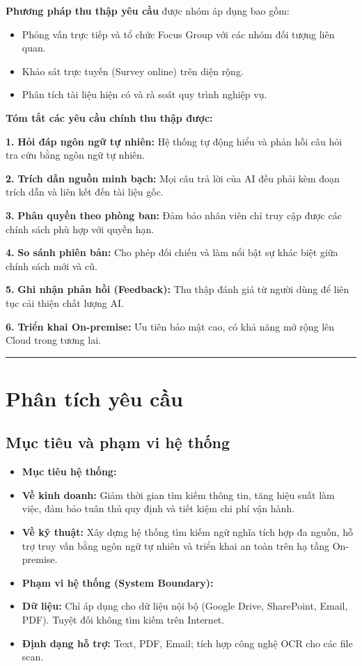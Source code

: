 \documentclass[12pt,a4paper]{report}
\begin{document}
\textbf{Phương pháp thu thập yêu cầu} được nhóm áp dụng bao gồm:
\begin{itemize}
    \item Phỏng vấn trực tiếp và tổ chức Focus Group với các nhóm đối tượng liên quan.
    \item Khảo sát trực tuyến (Survey online) trên diện rộng.
    \item Phân tích tài liệu hiện có và rà soát quy trình nghiệp vụ.
\end{itemize}

\textbf{Tóm tắt các yêu cầu chính thu thập được:}

\textbf{1.} \textbf{Hỏi đáp ngôn ngữ tự nhiên:} Hệ thống tự động hiểu và phản hồi câu hỏi tra cứu bằng ngôn ngữ tự nhiên.


\textbf{2.} \textbf{Trích dẫn nguồn minh bạch:} Mọi câu trả lời của AI đều phải kèm đoạn trích dẫn và liên kết đến tài liệu gốc.


\textbf{3.} \textbf{Phân quyền theo phòng ban:} Đảm bảo nhân viên chỉ truy cập được các chính sách phù hợp với quyền hạn.


\textbf{4.} \textbf{So sánh phiên bản:} Cho phép đối chiếu và làm nổi bật sự khác biệt giữa chính sách mới và cũ.


\textbf{5.} \textbf{Ghi nhận phản hồi (Feedback):} Thu thập đánh giá từ người dùng để liên tục cải thiện chất lượng AI.


\textbf{6.} \textbf{Triển khai On-premise:} Ưu tiên bảo mật cao, có khả năng mở rộng lên Cloud trong tương lai.



\rule{\textwidth}{0.5pt}


\section{Phân tích yêu cầu}

\subsection{Mục tiêu và phạm vi hệ thống}
\begin{itemize}
    \item \textbf{Mục tiêu hệ thống:}
    \item \textbf{Về kinh doanh:} Giảm thời gian tìm kiếm thông tin, tăng hiệu suất làm việc, đảm bảo tuân thủ quy định và tiết kiệm chi phí vận hành.
    \item \textbf{Về kỹ thuật:} Xây dựng hệ thống tìm kiếm ngữ nghĩa tích hợp đa nguồn, hỗ trợ truy vấn bằng ngôn ngữ tự nhiên và triển khai an toàn trên hạ tầng On-premise.
    \item \textbf{Phạm vi hệ thống (System Boundary):}
    \item \textbf{Dữ liệu:} Chỉ áp dụng cho dữ liệu nội bộ (Google Drive, SharePoint, Email, PDF). Tuyệt đối không tìm kiếm trên Internet.
    \item \textbf{Định dạng hỗ trợ:} Text, PDF, Email; tích hợp công nghệ OCR cho các file scan.
\end{itemize}
\end{document}
